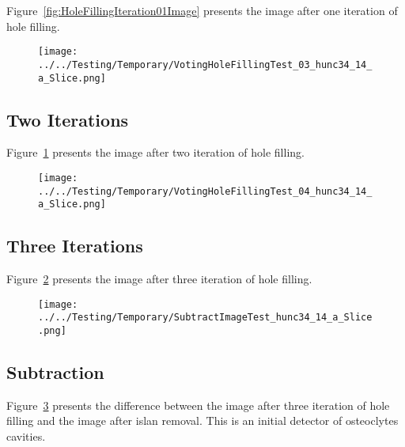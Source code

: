 \documentclass{InsightArticle}
\begin{document}
Figure~\ref{fig:HoleFillingIteration01Image} presents the image after one iteration of hole filling.


\clearpage
\begin{figure}
\center
\texttt{[image: ../../Testing/Temporary/VotingHoleFillingTest\_03\_hunc34\_14\_a\_Slice.png]}
\label{fig:HoleFillingIteration02Image}
\end{figure}


\subsection{Two Iterations}

Figure~\ref{fig:HoleFillingIteration02Image} presents the image after two iteration of hole filling.


\clearpage
\begin{figure}
\center
\texttt{[image: ../../Testing/Temporary/VotingHoleFillingTest\_04\_hunc34\_14\_a\_Slice.png]}
\label{fig:HoleFillingIteration03Image}
\end{figure}


\subsection{Three Iterations}

Figure~\ref{fig:HoleFillingIteration03Image} presents the image after three iteration of hole filling.



\clearpage
\begin{figure}
\center
\texttt{[image: ../../Testing/Temporary/SubtractImageTest\_hunc34\_14\_a\_Slice.png]}
\label{fig:SubtractionImage}
\end{figure}

\subsection{Subtraction}

Figure~\ref{fig:SubtractionImage} presents the difference between the image
after three iteration of hole filling and the image after islan removal. This
is an initial detector of osteoclytes cavities.
\end{document}
